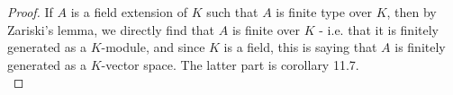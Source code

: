 \documentclass[reqno]{amsart}
\theoremstyle{definition}
\theoremstyle{remark}
\begin{document}
    \begin{proof}
        If $A$ is a field extension of $K$ such that
        $A$ is finite type over $K$, then
        by Zariski's lemma, we directly find that
        $A$ is finite over $K$ - i.e. that it
        is finitely generated as a $K$-module, and since
        $K$ is a field, this is saying that
        $A$ is finitely generated as a $K$-vector space.
        The latter part is corollary 11.7.\\
        \linebreak
    \end{proof}





\end{document}
